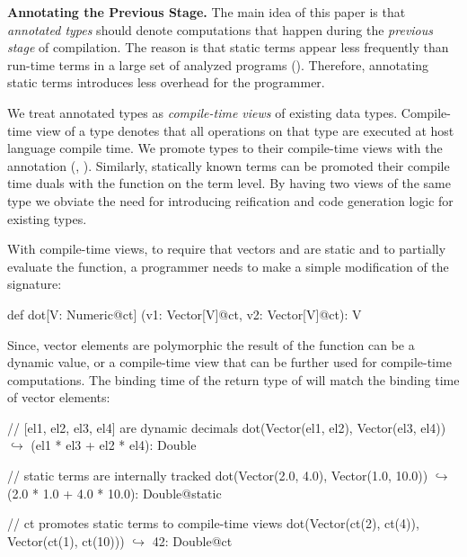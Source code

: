 {\bf Annotating the Previous Stage.} The main idea of this paper is that \emph{annotated types}
 should denote computations that happen during the \emph{previous stage} of compilation.
 The reason is that static terms appear less frequently than run-time terms in a large set
 of analyzed programs (). Therefore, annotating static terms
 introduces less overhead for the programmer.

We treat annotated types as \emph{compile-time views}
 of existing data types. Compile-time view of a type denotes that all operations on that type are
 executed at host language compile time. We promote types to their compile-time views
 with the  annotation (\eg, ). Similarly, statically known terms can be promoted
 their compile time duals with the  function on the term level.
 By having two views of the same type we obviate the need for introducing reification and code generation logic for
 existing types.

With compile-time views, to require that vectors  and  are
 static and to partially evaluate the function, a programmer needs to make
 a simple modification of the  signature:\begin{lstparagraph}
def dot[V: Numeric@ct]
  (v1: Vector[V]@ct, v2: Vector[V]@ct): V
\end{lstparagraph}

Since, vector elements are polymorphic the result
 of the function can be a dynamic value, or a compile-time view
 that can be further used for compile-time computations. The binding time of the return type
 of  will match the binding time of vector elements:

\vspace{1.8mm}
\begin{listing}[mathescape]
  // [el1, el2, el3, el4] are dynamic decimals
  dot(Vector(el1, el2), Vector(el3, el4))
    $\hookrightarrow$ (el1 * el3 + el2 * el4): Double

  // static terms are internally tracked
  dot(Vector(2.0, 4.0), Vector(1.0, 10.0))
    $\hookrightarrow$ (2.0 * 1.0 + 4.0 * 10.0): Double@static

  // ct promotes static terms to compile-time views
  dot(Vector(ct(2), ct(4)),
      Vector(ct(1), ct(10)))
    $\hookrightarrow$ 42: Double@ct
\end{listing}
\vspace{1.8mm}


